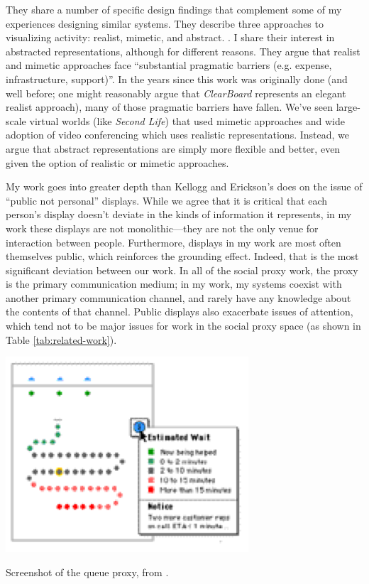 \documentclass{tufte-handout}
\begin{document}
They share a number of specific design findings that complement some of my experiences designing similar systems. They describe three approaches to visualizing activity: realist, mimetic, and abstract. \citep{Erickson:2003td}. I share their interest in abstracted representations, although for different reasons. They argue that realist and mimetic approaches face ``substantial pragmatic barriers (e.g. expense, infrastructure, support)''. In the years since this work was originally done (and well before; one might reasonably argue that \emph{ClearBoard} \citep{Ishii:1992bq} represents an elegant realist approach), many of those pragmatic barriers have fallen. We've seen large-scale virtual worlds (like \emph{Second Life}) that used mimetic approaches and wide adoption of video conferencing which uses realistic representations. Instead, we argue that abstract representations are simply more flexible and better, even given the option of realistic or mimetic approaches.


My work goes into greater depth than Kellogg and Erickson's does on the issue of ``public not personal'' displays. While we agree that it is critical that each person's display doesn't deviate in the kinds of information it represents, in my work these displays are not monolithic---they are not the only venue for interaction between people. Furthermore, displays in my work are most often themselves public, which reinforces the grounding effect. Indeed, that is the most significant deviation between our work. In all of the social proxy work, the proxy is the primary communication medium; in my work, my systems coexist with another primary communication channel, and rarely have any knowledge about the contents of that channel. Public displays also exacerbate issues of attention, which tend not to be major issues for work in the social proxy space (as shown in Table \ref{tab:related-work}). 




\begin{marginfigure}
	\includegraphics{figures/queue.png}
	\caption{Screenshot of the queue proxy, from \citep{Erickson:2003td}.}
	\label{fig:proxy-queue}
\end{marginfigure}
\end{document}

